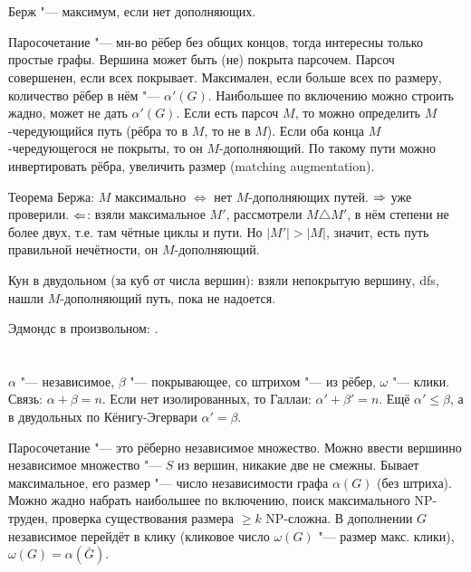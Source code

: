 \section{} %
	Берж "--- максимум, если нет дополняющих.

	Паросочетание "--- мн-во рёбер без общих концов, тогда интересны только простые графы.
	Вершина может быть (не) покрыта парсочем.
	Парсоч совершенен, если всех покрывает.
	Максимален, если больше всех по размеру, количество рёбер в нём "--- $\alpha'(G)$.
	Наибольшее по включению можно строить жадно, может не дать $\alpha'(G)$.
	Если есть парсоч $M$, то можно определить $M$-чередующийся путь (рёбра то в $M$, то не в $M$).
	Если оба конца $M$-чередующегося не покрыты, то он $M$-дополняющий.
	По такому пути можно инвертировать рёбра, увеличить размер (matching augmentation).

	Теорема Бержа: $M$ максимально $\iff$ нет $M$-дополняющих путей.
	$\Rightarrow$ уже проверили.
	$\Leftarrow$: взяли максимальное $M'$, рассмотрели $M \triangle M'$, в нём степени не более двух,
	т.е. там чётные циклы и пути.
	Но $|M'|>|M|$, значит, есть путь правильной нечётности, он $M$-дополняющий.

	Кун в двудольном (за куб от числа вершин): взяли непокрытую вершину, dfs, нашли $M$-дополняющий путь, пока не надоется.
	\TODO

	Эдмондс в произвольном: \TODO.

\section{} %
	$\alpha$ "--- независимое, $\beta$ "--- покрывающее, со штрихом  "--- из рёбер,
	$\omega$ "--- клики.
	Связь: $\alpha+\beta=n$.
	Если нет изолированных, то Галлаи: $\alpha'+\beta'=n$.
	Ещё $\alpha' \le \beta$, а в двудольных по Кёнигу-Эгервари $\alpha'=\beta$.

	Паросочетание "--- это рёберно независимое множество.
	Можно ввести вершинно независимое множество "--- $S$ из вершин, никакие две не смежны.
	Бывает максимальное, его размер "--- число независимости графа $\alpha(G)$ (без штриха).
	Можно жадно набрать наибольшее по включению, поиск максимального NP-труден,
	проверка существования размера $\ge k$ NP-сложна.
	В дополнении $G$ независимое перейдёт в клику (кликовое число $\omega(G)$ "--- размер макс. клики),
	$\omega(G)=\alpha(\bar G)$.

